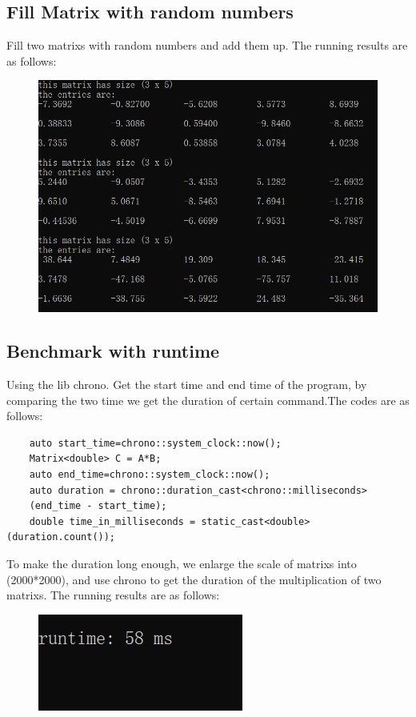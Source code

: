 \documentclass[12pt]{article}
\begin{document}
\subsection{Fill Matrix with random numbers}
Fill two matrixs with random numbers and add them up. The running results are as follows:
\begin{figure}[H]
    \centering
    \includegraphics[scale=0.9]{pic1.png}
\end{figure}

\subsection{Benchmark with runtime}
Using the lib chrono. Get the start time and end time of the program, by comparing the two time we get the duration 
of certain command.The codes are as follows:
\begin{lstlisting}
    auto start_time=chrono::system_clock::now();
    Matrix<double> C = A*B;
    auto end_time=chrono::system_clock::now();
    auto duration = chrono::duration_cast<chrono::milliseconds>
    (end_time - start_time);
    double time_in_milliseconds = static_cast<double>(duration.count());
\end{lstlisting}
To make the duration long enough, we enlarge the scale of matrixs into {(2000*2000)}, and use chrono to get the duration of 
the multiplication of two matrixs. The running results are as follows:
\begin{figure}[H]
    \centering
    \includegraphics{pic2.png}
\end{figure}
\end{document}
